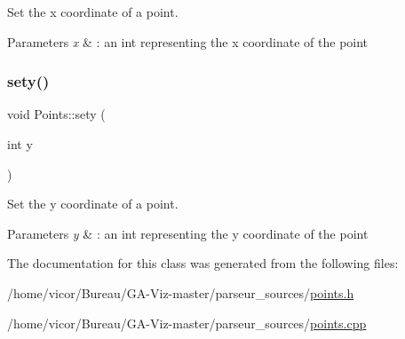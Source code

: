 Set the x coordinate of a point. 


\begin{DoxyParams}{Parameters}
{\em x} & \+: an int representing the x coordinate of the point \\
\hline
\end{DoxyParams}
\mbox{\label{class_points_a54f8ad58213ae7284f091f2a117236f3}} 
\subsubsection{\texorpdfstring{sety()}{sety()}}
{\footnotesize\ttfamily void Points\+::sety (\begin{DoxyParamCaption}\item[{int}]{y }\end{DoxyParamCaption})}



Set the y coordinate of a point. 


\begin{DoxyParams}{Parameters}
{\em y} & \+: an int representing the y coordinate of the point \\
\hline
\end{DoxyParams}


The documentation for this class was generated from the following files\+:\begin{DoxyCompactItemize}
\item 
/home/vicor/\+Bureau/\+G\+A-\/\+Viz-\/master/parseur\+\_\+sources/\hyperlink{points_8h}{points.\+h}\item 
/home/vicor/\+Bureau/\+G\+A-\/\+Viz-\/master/parseur\+\_\+sources/\hyperlink{points_8cpp}{points.\+cpp}\end{DoxyCompactItemize}
